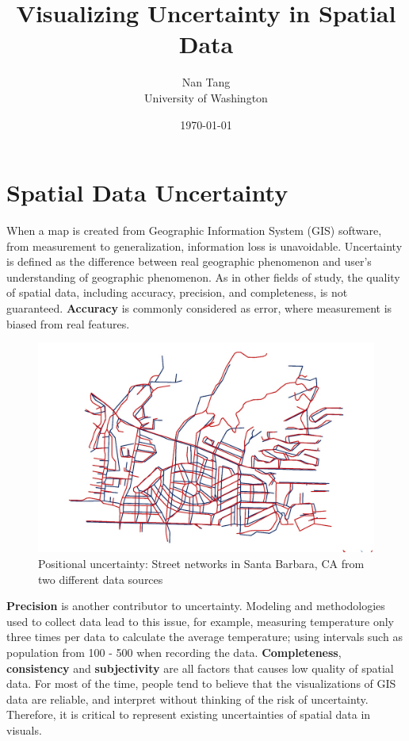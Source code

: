 \documentclass[11pt,letterpaper]{article}
\title{Visualizing Uncertainty in Spatial Data}
\author{Nan Tang \\ University of Washington}
\date{\today}
\begin{document}
\maketitle
\section*{Spatial Data Uncertainty}
\noindent When a map is created from Geographic Information System (GIS) software, from measurement to generalization, information loss is unavoidable. Uncertainty is defined as the difference between real geographic phenomenon and user's understanding of geographic phenomenon. As in other fields of study, the quality of spatial data, including accuracy, precision, and completeness, is not guaranteed. \textbf{Accuracy} is commonly considered as error, where measurement is biased from real features. 

\begin{figure}
\includegraphics[scale=0.7]{memo_fig1.png}
\caption{Positional uncertainty: Street networks in Santa Barbara, CA from two different data sources}
\end{figure}

\noindent \textbf{Precision} is another contributor to uncertainty. Modeling and methodologies used to collect data lead to this issue, for example, measuring temperature only three times per data to calculate the average temperature; using intervals such as population from 100 - 500 when recording the data. \textbf{Completeness}, \textbf{consistency} and \textbf{subjectivity} are all factors that causes low quality of spatial data. For most of the time, people tend to believe that the visualizations of GIS data are reliable, and interpret without thinking of the risk of uncertainty. Therefore, it is critical to represent existing uncertainties of spatial data in visuals. 
\end{document}
